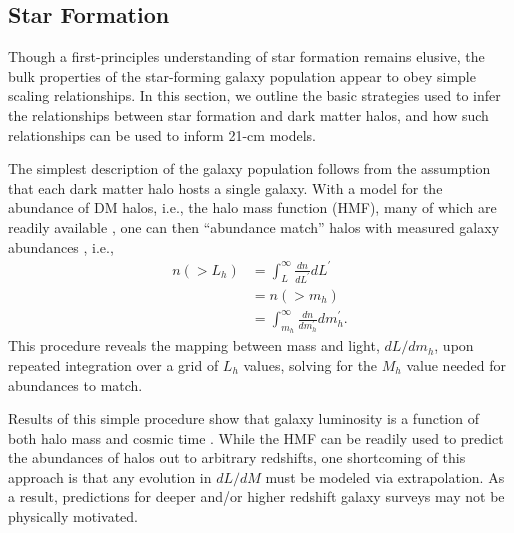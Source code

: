 \subsection{Star Formation} \label{sec:sfe}
Though a first-principles understanding of star formation remains elusive, the bulk properties of the star-forming galaxy population appear to obey simple scaling relationships. In this section, we outline the basic strategies used to infer the relationships between star formation and dark matter halos, and how such relationships can be used to inform 21-cm models.

The simplest description of the galaxy population follows from the assumption that each dark matter halo hosts a single galaxy. With a model for the abundance of DM halos, i.e., the halo mass function (HMF), many of which are readily available \cite{PS1974,SMT2001}, one can then ``abundance match'' halos with measured galaxy abundances \cite{Bouwens2015,Finkelstein2015}, i.e.,
\begin{align}
	n(>L_h) & = \int_L^{\infty} \frac{dn}{dL^{\prime}} dL^{\prime} \nonumber \\
	& = n(>m_h)  \nonumber \\
	& = \int_{m_h}^{\infty} \frac{dn}{dm_h^{\prime}} dm_h^{\prime} .
\end{align}
This procedure reveals the mapping between mass and light, $dL/dm_h$, upon repeated integration over a grid of $L_h$ values, solving for the $M_h$ value needed for abundances to match. 

Results of this simple procedure show that galaxy luminosity is a function of both halo mass and cosmic time \cite{Trenti2009,Moster2010,Behroozi2013,Tacchella2018,Mashian2016,Sun2016,Mason2015}. While the HMF can be readily used to predict the abundances of halos out to arbitrary redshifts, one shortcoming of this approach is that any evolution in $dL/dM$ must be modeled via extrapolation. As a result, predictions for deeper and/or higher redshift galaxy surveys may not be physically motivated.

